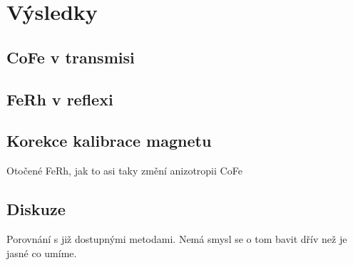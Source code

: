 \chapter{Výsledky} \label{k:vysledky}

\section{CoFe v transmisi}

\section{FeRh v reflexi}

\section{Korekce kalibrace magnetu}

Otočené FeRh, jak to asi taky změní anizotropii CoFe

\section{Diskuze}

Porovnání s již dostupnými metodami.
Nemá smysl se o tom bavit dřív než je jasné co umíme.
